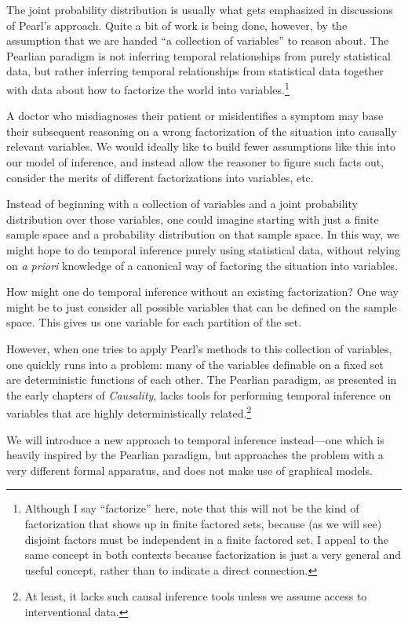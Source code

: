\documentclass[authordate,onecolumn]{miri-tech-article}
\begin{document}
The joint probability distribution is usually what gets emphasized in discussions of Pearl's approach. Quite a bit of work is being done, however, by the assumption that we are handed ``a collection of variables'' to reason about. The Pearlian paradigm is not inferring temporal relationships from purely statistical data, but rather inferring temporal relationships from statistical data together with data about how to factorize the world into variables.\footnote{Although I say ``factorize'' here, note that this will not be the kind of factorization that shows up in finite factored sets, because (as we will see) disjoint factors must be independent in a finite factored set. I appeal to the same concept in both contexts because factorization is just a very general and useful concept, rather than to indicate a direct connection.}

A doctor who misdiagnoses their patient or misidentifies a symptom may base their subsequent reasoning on a wrong factorization of the situation into causally relevant variables. We would ideally like to build fewer assumptions like this into our model of inference, and instead allow the reasoner to figure such facts out, consider the merits of different factorizations into variables, etc.

Instead of beginning with a collection of variables and a joint probability distribution over those variables, one could imagine starting with just a finite sample space and a probability distribution on that sample space. In this way, we might hope to do temporal inference purely using statistical data, without relying on \emph{a priori} knowledge of a canonical way of factoring the situation into variables.

How might one do temporal inference without an existing factorization? One way might be to just consider all possible variables that can be defined on the sample space. This gives us one variable for each partition of the set.

However, when one tries to apply Pearl's methods to this collection of variables, one quickly runs into a problem: many of the variables definable on a fixed set are deterministic functions of each other. The Pearlian paradigm, as presented in the early chapters of \emph{Causality}, lacks tools for performing temporal inference on variables that are highly deterministically related.\footnote{At least, it lacks such causal inference tools unless we assume access to interventional data.}

We will introduce a new approach to temporal inference instead---one which is heavily inspired by the Pearlian paradigm, but approaches the problem with a very different formal apparatus, and does not make use of graphical models.
\end{document}
